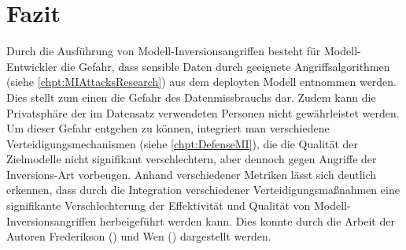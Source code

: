 \section{Fazit}
Durch die Ausführung von Modell-Inversionsangriffen besteht für Modell-Entwickler die Gefahr, dass sensible Daten durch geeignete Angriffsalgorithmen (siehe \ref{chpt:MIAttacksResearch}) aus dem deployten Modell entnommen werden. Dies stellt zum einen die Gefahr des Datenmissbrauchs dar. Zudem kann die Privatsphäre der im Datensatz verwendeten Personen nicht gewährleistet werden. Um dieser Gefahr entgehen zu können, integriert man verschiedene Verteidigungsmechanismen (siehe \ref{chpt:DefenseMI}), die die Qualität der Zielmodelle nicht signifikant verschlechtern, aber dennoch gegen Angriffe der Inversions-Art vorbeugen. 
Anhand verschiedener Metriken lässt sich deutlich erkennen, dass durch die Integration verschiedener Verteidigungsmaßnahmen eine signifikante Verschlechterung der Effektivität und Qualität von Modell-Inversionsangriffen herbeigeführt werden kann. Dies konnte durch die Arbeit der Autoren Frederikson (\cite{fredrikson_privacy_2014}) und Wen (\cite{wen_defending_2021}) dargestellt werden.